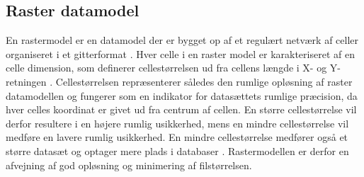 \subsection{Raster datamodel} \label{Afsnit: Raster data model}

En rastermodel er en datamodel der er bygget op af et regulært netværk af celler organiseret i et gitterformat \citep{bolstad_gis_2022, esri_raster}. Hver celle i en raster model er karakteriseret af en celle dimension, som definerer cellestørrelsen ud fra cellens længde i X- og Y-retningen \citep{bolstad_gis_2022}. Cellestørrelsen repræsenterer således den rumlige opløsning af raster datamodellen og fungerer som en indikator for datasættets rumlige præcision, da hver celles koordinat er givet ud fra centrum af cellen. En større cellestørrelse vil derfor resultere i en højere rumlig usikkerhed, mens en mindre cellestørrelse vil medføre en lavere rumlig usikkerhed. En mindre cellestørrelse medfører også et større datasæt og optager mere plads i databaser \citep{bolstad_gis_2022}. Rastermodellen er derfor en afvejning af god opløsning og minimering af  filstørrelsen.\\

